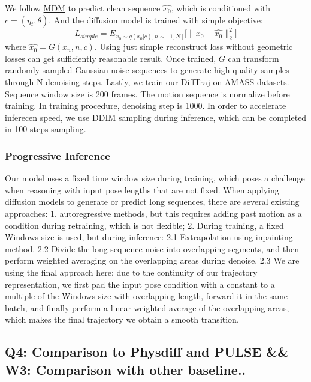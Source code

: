 \documentclass{article}
\begin{document}
We follow \href{https://github.com/GuyTevet/motion-diffusion-model}{MDM} to predict clean sequence $\hat{x_0}$, which is conditioned with $c=(\eta_t,\theta)$. And the diffusion model is trained with simple objective: \[
L_{simple} = E_{x_0 \sim q(x_0|c),n \sim [1,N]} \big[\big\|x_0-\hat{x_0}\big\|^2_2\big]
\] where $\hat{x_0} = G(x_n,n,c)$. Using just simple reconstruct loss without geometric losses can get sufficiently reasonable result. Once trained, $G$ can transform randomly sampled Gaussian noise sequences to generate high-quality samples through N denoising steps. Lastly, we train our DiffTraj on AMASS datasets. Sequence window size is 200 frames. The motion sequence is normalize before training. In training procedure, denoising step is 1000. In order to accelerate inferecen speed, we use DDIM sampling during inference, which can be completed in 100 steps sampling.

\subsubsection{Progressive Inference}\label{progressive-inference}

Our model uses a fixed time window size during training, which poses a challenge when reasoning with input pose lengths that are not fixed. When applying diffusion models to generate or predict long sequences, there are several existing approaches: 1. autoregressive methods, but this requires adding past motion as a condition during retraining, which is not flexible; 2. During training, a fixed Windows size is used, but during inference: 2.1 Extrapolation using inpainting method. 2.2 Divide the long sequence noise into overlapping segments, and then perform weighted averaging on the overlapping areas during denoise. 2.3 We are using the final approach here: due to the continuity of our trajectory representation, we first pad the input pose condition with a constant to a multiple of the Windows size with overlapping length, forward it in the same batch, and finally perform a linear weighted average of the overlapping areas, which makes the final trajectory we obtain a smooth transition.

\subsection{Q4: Comparison to Physdiff and PULSE \&\& W3: Comparison with other baseline..}\label{q4-comparison-to-physdiff-and-pulse-w3-comparison-with-other-baseline..}
\end{document}
